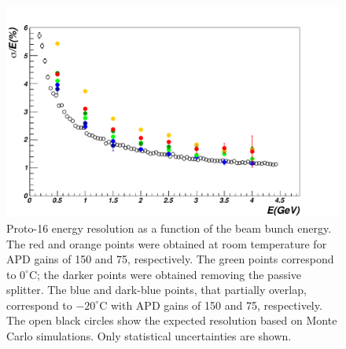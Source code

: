 \begin{figure}
\includegraphics[width=1.0\columnwidth]{./fig/btf_resolution.pdf}
\caption{Proto-16 energy resolution as a function of the beam bunch energy. The red and orange points were obtained
  at room temperature for APD gains of 150 and 75, respectively. The green points correspond to $0^\circ$C; the
  darker points were obtained removing the passive splitter. The blue and dark-blue points, that partially overlap,
  correspond to $-20^\circ$C  with APD gains of 150 and 75, respectively. The open black circles show the expected
  resolution based on Monte Carlo simulations. Only statistical uncertainties are shown.}
\label{fig:btf_resolution}
\end{figure} 
